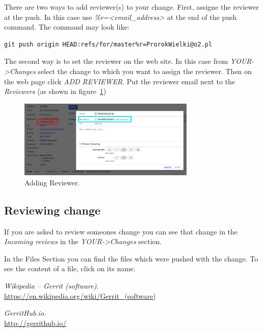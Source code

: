 \documentclass{article}
\begin{document}
There are two ways to add reviewer(s) to your change. First, assigne the reviewer at the push. In this case use \textit{\%r=<email\_address>} at the end of the push command. The command may look like:

\begin{lstlisting}
git push origin HEAD:refs/for/master%r=ProrokWielki@o2.pl
\end{lstlisting}

The second way is to set the reviewer on the web site. In this case from \textit{YOUR->Changes} select the change to which you want to assign the reviewer. Then on the web page click \textit{ADD REVIEWER}. Put the reviewer email next to the \textit{Reviewers} (as shown in figure~\ref{fig:Reviewer})

\begin{figure}[!ht]
  \centering
  \includegraphics[width=0.75\textwidth]{img/Reviewer}
  \caption{Adding Reviewer.}
  \label{fig:Reviewer}
\end{figure}

\subsection{Reviewing change}

If you are asked to review someones change you can see that change in the \textit{Incoming reviews} in the \textit{YOUR->Changes} section.

In the Files Section you can find the files which were pushed with the change. To see the content of a file, click on its name.

\newpage

\begin{thebibliography}{9}

\textit{Wikipedia -- Gerrit (software)}.\\ 
\url{https://en.wikipedia.org/wiki/Gerrit_(software)}
 
\textit{GerritHub.io}.\\ 
\url{http://gerrithub.io/}

\end{thebibliography}

\newpage

\begin{versionhistory}
\end{versionhistory}
\end{document}
